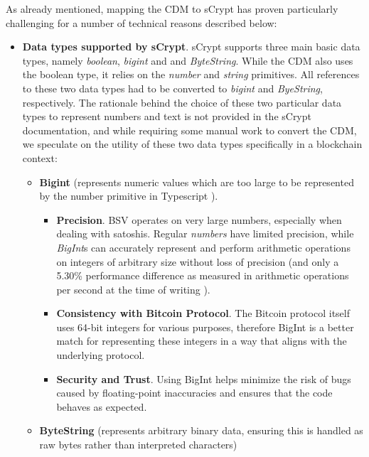 As already mentioned, mapping the CDM to sCrypt has proven particularly challenging for a number of technical reasons described below:

\begin{itemize}

    \item \textbf{Data types supported by sCrypt}. sCrypt supports three main basic data types, namely \textit{boolean}, \textit{bigint} and and \textit{ByteString}. While the CDM also uses the boolean type, it relies on the \textit{number} and \textit{string} primitives. All references to these two data types had to be converted to \textit{bigint} and \textit{ByeString}, respectively. The rationale behind the choice of these two particular data types to represent numbers and text is not provided in the sCrypt documentation, and while requiring some manual work to convert the CDM, we speculate on the utility of these two data types specifically in a blockchain context:

    \begin{itemize}
        \item \textbf{Bigint} (represents numeric values which are too large to be represented by the number primitive in Typescript \citep{bigint}).
        
        \begin{itemize}
            \item \textbf{Precision}. BSV operates on very large numbers, especially when dealing with satoshis. Regular \textit{numbers} have limited precision, while \textit{BigInt}s can accurately represent and perform arithmetic operations on integers of arbitrary size without loss of precision (and only a 5.30\% performance difference as measured in arithmetic operations per second at the time of writing \citep{bigint_number_performance}).
            \item \textbf{Consistency with Bitcoin Protocol}. The Bitcoin protocol itself uses 64-bit integers for various purposes, therefore BigInt is a better match for representing these integers in a way that aligns with the underlying protocol.
            \item \textbf{Security and Trust}. Using BigInt helps minimize the risk of bugs caused by floating-point inaccuracies and ensures that the code behaves as expected.
        \end{itemize}
        
        \item \textbf{ByteString} (represents arbitrary binary data, ensuring this is handled as raw bytes rather than interpreted characters)


\end{itemize}
\end{itemize}
